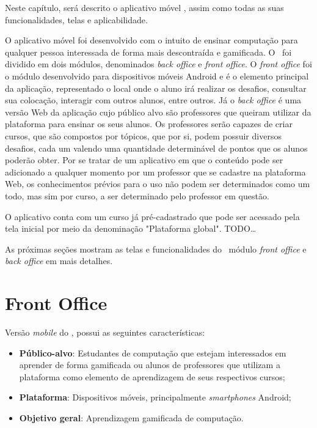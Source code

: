 Neste capítulo, será descrito o aplicativo móvel \appName, assim como todas as suas funcionalidades, telas e aplicabilidade.

O aplicativo móvel foi desenvolvido com o intuito de ensinar computação para qualquer pessoa interessada de forma mais descontraída e gamificada. O \appName\ foi dividido em dois módulos, denominados \textit{back office} e \textit{front office}. O \textit{front office} foi o módulo desenvolvido para dispositivos móveis Android e é o elemento principal da aplicação, representado o local onde o aluno irá realizar os desafios, consultar sua colocação, interagir com outros alunos, entre outros. Já o \textit{back office} é uma versão Web da aplicação cujo público alvo são professores que queiram utilizar da plataforma para ensinar os seus alunos. Os professores serão capazes de criar cursos, que são compostos por tópicos, que por si, podem possuir diversos desafios, cada um valendo uma quantidade determinável de pontos que os alunos poderão obter. Por se tratar de um aplicativo em que o conteúdo pode ser adicionado a qualquer momento por um professor que se cadastre na plataforma Web, os conhecimentos prévios para o uso não podem ser determinados como um todo, mas sim por curso, a ser determinado pelo professor em questão.

O aplicativo conta com um curso já pré-cadastrado que pode ser acessado pela tela inicial por meio da denominação "Plataforma global". TODO\dots

As próximas seções mostram as telas e funcionalidades do \appName\, módulo \textit{front office} e \textit{back office} em mais detalhes.

\section{Front Office}

Versão \textit{mobile} do \appName, possui as seguintes características:

\begin{itemize}
    \item \textbf{Público-alvo}: Estudantes de computação que estejam interessados em aprender de forma gamificada ou alunos de professores que utilizam a plataforma como elemento de aprendizagem de seus respectivos cursos;
    \item \textbf{Plataforma}: Dispositivos móveis, principalmente \textit{smartphones} Android;
    \item \textbf{Objetivo geral}: Aprendizagem gamificada de computação.
\end{itemize}
